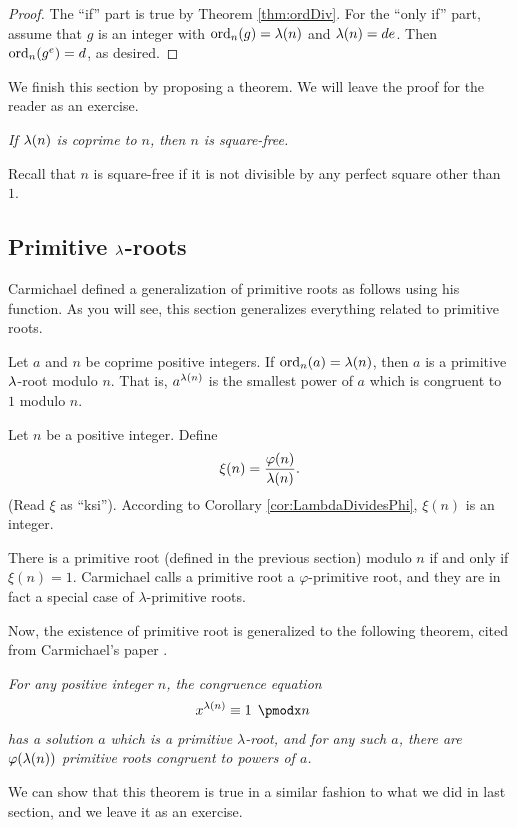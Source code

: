 \documentclass{subfile}
\begin{document}
	\begin{proof}
		The ``if'' part is true by Theorem \ref{thm:ordDiv}. For the ``only if'' part, assume that $g$ is an integer with $\operatorname{ord}_n(g)=\lambda(n)$ and $\lambda(n)=de$. Then $\operatorname{ord}_n(g^e)=d$, as desired.
	\end{proof}
	
	We finish this section by proposing a theorem. We will leave the proof for the reader as an exercise.
		\begin{theorem}\slshape
			If $\lambda(n)$ is coprime to $n$, then $n$ is square-free.
		\end{theorem}
	Recall that $n$ is square-free if it is not divisible by any perfect square other than $1$.
	
	\subsection{Primitive $\lambda$-roots}
	Carmichael defined a generalization of primitive roots as follows using his function. As you will see, this section generalizes everything related to primitive roots.
	\begin{definition}
		Let $a$ and $n$ be coprime positive integers. If $\operatorname{ord}_n(a)=\lambda(n)$, then $a$ is a primitive $\lambda$-root modulo $n$. That is, $a^{\lambda(n)}$ is the smallest power of $a$ which is congruent to $1$ modulo $n$. 
	\end{definition}

	\begin{definition}
		Let $n$ be a positive integer. Define $$\xi(n) = \frac{\varphi(n)}{\lambda(n)}.$$ (Read $\xi$ as ``ksi''). According to Corollary \ref{cor:LambdaDividesPhi}, $\xi(n)$ is an integer.
	\end{definition}

	\begin{proposition}
		 There is a primitive root (defined in the previous section) modulo $n$ if and only if $\xi(n)=1$. Carmichael calls a primitive root a $\varphi$-primitive root, and they are in fact a special case of $\lambda$-primitive roots.
	\end{proposition}

	Now, the existence of primitive root is generalized to the following theorem, cited from Carmichael's paper \cite{ch:congruence-carmichael-original}.
	\begin{theorem}[Carmicahel]\slshape
		For any positive integer $n$, the congruence equation
			\begin{align*}
				x^{\l(n)} & \equiv1\pmod n
			\end{align*}
		has a solution $a$ which is a primitive $\lambda$-root, and for any such $a$, there are $\varphi(\lambda(n))$ primitive roots congruent to powers of $a$.
	\end{theorem}
	We can show that this theorem is true in a similar fashion to what we did in last section, and we leave it as an exercise.
	
\end{document}
